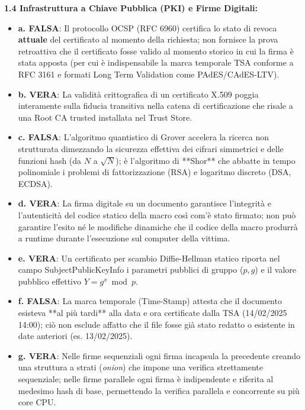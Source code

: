 \documentclass[11pt,a4paper]{article}
\begin{document}
\begin{solutionbox}
\textbf{1.4 Infrastruttura a Chiave Pubblica (PKI) e Firme Digitali:}
\begin{itemize}
    \item \textbf{a. FALSA}: Il protocollo OCSP (RFC 6960) certifica lo stato di revoca \textbf{attuale} del certificato al momento della richiesta; non fornisce la prova retroattiva che il certificato fosse valido al momento storico in cui la firma \`e stata apposta (per cui \`e indispensabile la marca temporale TSA conforme a RFC 3161 e formati Long Term Validation come PAdES/CAdES-LTV).
    \item \textbf{b. VERA}: La validit\`a crittografica di un certificato X.509 poggia interamente sulla fiducia transitiva nella catena di certificazione che risale a una Root CA trusted installata nel Trust Store.
    \item \textbf{c. FALSA}: L'algoritmo quantistico di Grover accelera la ricerca non strutturata dimezzando la sicurezza effettiva dei cifrari simmetrici e delle funzioni hash (da $N$ a $\sqrt{N}$); \`e l'algoritmo di **Shor** che abbatte in tempo polinomiale i problemi di fattorizzazione (RSA) e logaritmo discreto (DSA, ECDSA).
    \item \textbf{d. VERA}: La firma digitale su un documento garantisce l'integrit\`a e l'autenticit\`a del codice statico della macro cos\`i com'\`e stato firmato; non pu\`o garantire l'esito n\'e le modifiche dinamiche che il codice della macro produrr\`a a runtime durante l'esecuzione sul computer della vittima.
    \item \textbf{e. VERA}: Un certificato per scambio Diffie-Hellman statico riporta nel campo SubjectPublicKeyInfo i parametri pubblici di gruppo ($p, g$) e il valore pubblico effettivo $Y = g^x \bmod p$.
    \item \textbf{f. FALSA}: La marca temporale (Time-Stamp) attesta che il documento esisteva **al pi\`u tardi** alla data e ora certificate dalla TSA (14/02/2025 14:00); ci\`o non esclude affatto che il file fosse gi\`a stato redatto o esistente in date anteriori (es. 13/02/2025).
    \item \textbf{g. VERA}: Nelle firme sequenziali ogni firma incapsula la precedente creando una struttura a strati (\textit{onion}) che impone una verifica strettamente sequenziale; nelle firme parallele ogni firma \`e indipendente e riferita al medesimo hash di base, permettendo la verifica parallela e concorrente su pi\`u core CPU.
\end{itemize}


\end{solutionbox}
\end{document}
